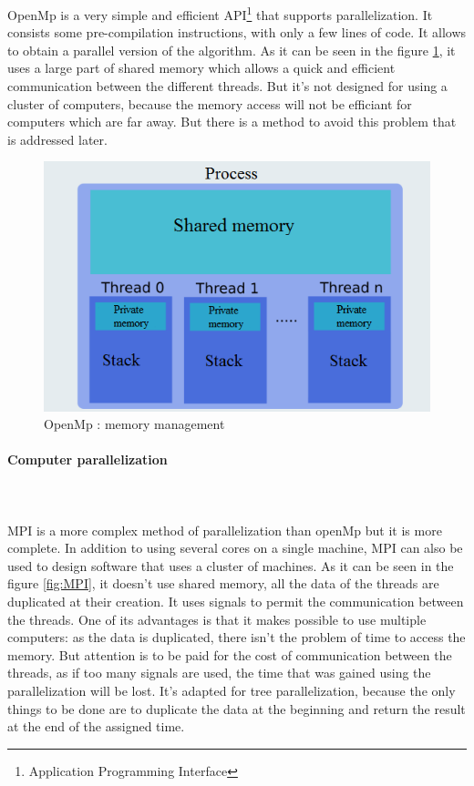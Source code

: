 OpenMp is a very simple and efficient API\footnote{Application Programming Interface} that supports parallelization. It consists some pre-compilation instructions, with only a few lines of code. It allows to obtain a parallel version of the algorithm. As it can be seen in the figure \ref{fig:OpenMp}, it uses a large part of shared memory which allows a quick and efficient communication between the different threads. But it's not designed for using a cluster of computers, because the memory access will not be efficiant for computers which are far away. But there is a method to avoid this problem that is addressed later.
\begin{figure}[!h] 
\centerline{\includegraphics[scale=0.50]{3_Software_considered/MultithreadingMP_boost_Visual_MPI_5000_Zotero_Project_Baptiste/OpenMP}}
   \caption{\label{étiquette} OpenMp : memory management}
\label{fig:OpenMp}
\end{figure}
\newpage
\paragraph{Computer parallelization}\mbox{}\\\mbox{}\\

MPI is a more complex method of parallelization than openMp but it is more complete. In addition to using several cores on a single machine, MPI can also be used to design software that uses a cluster of machines. As it can be seen in the figure \ref{fig:MPI}, it doesn't use shared memory, all the data of the threads are duplicated at their creation. It uses signals to permit the communication between the threads. One of its advantages is that it makes possible to use multiple computers: as the data is duplicated, there isn't the problem of time to access the memory. But attention is to be paid for the cost of communication between the threads, as if too many signals are used, the time that was gained using the parallelization will be lost. It's adapted for tree parallelization, because the only things to be done are to duplicate the data at the beginning and return the result at the end of the assigned time.

